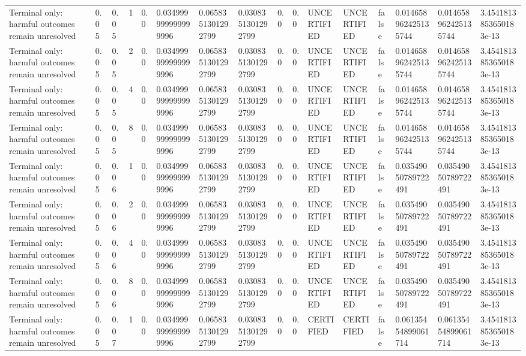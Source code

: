 \begin{tabular}{llllllllllllllll}
Terminal only: harmful outcomes remain unresolved & 0.05 & 0.05 & 1 & 0.0 & 0.034999999999999996 & 0.0658351301292799 & 0.0308351301292799 & 0.0 & 0.0 & UNCERTIFIED & UNCERTIFIED & false & 0.014658962425135744 & 0.014658962425135744 & 3.4541813853650183e-13 \\
Terminal only: harmful outcomes remain unresolved & 0.05 & 0.05 & 2 & 0.0 & 0.034999999999999996 & 0.0658351301292799 & 0.0308351301292799 & 0.0 & 0.0 & UNCERTIFIED & UNCERTIFIED & false & 0.014658962425135744 & 0.014658962425135744 & 3.4541813853650183e-13 \\
Terminal only: harmful outcomes remain unresolved & 0.05 & 0.05 & 4 & 0.0 & 0.034999999999999996 & 0.0658351301292799 & 0.0308351301292799 & 0.0 & 0.0 & UNCERTIFIED & UNCERTIFIED & false & 0.014658962425135744 & 0.014658962425135744 & 3.4541813853650183e-13 \\
Terminal only: harmful outcomes remain unresolved & 0.05 & 0.05 & 8 & 0.0 & 0.034999999999999996 & 0.0658351301292799 & 0.0308351301292799 & 0.0 & 0.0 & UNCERTIFIED & UNCERTIFIED & false & 0.014658962425135744 & 0.014658962425135744 & 3.4541813853650183e-13 \\
Terminal only: harmful outcomes remain unresolved & 0.05 & 0.06 & 1 & 0.0 & 0.034999999999999996 & 0.0658351301292799 & 0.0308351301292799 & 0.0 & 0.0 & UNCERTIFIED & UNCERTIFIED & false & 0.03549050789722491 & 0.03549050789722491 & 3.4541813853650183e-13 \\
Terminal only: harmful outcomes remain unresolved & 0.05 & 0.06 & 2 & 0.0 & 0.034999999999999996 & 0.0658351301292799 & 0.0308351301292799 & 0.0 & 0.0 & UNCERTIFIED & UNCERTIFIED & false & 0.03549050789722491 & 0.03549050789722491 & 3.4541813853650183e-13 \\
Terminal only: harmful outcomes remain unresolved & 0.05 & 0.06 & 4 & 0.0 & 0.034999999999999996 & 0.0658351301292799 & 0.0308351301292799 & 0.0 & 0.0 & UNCERTIFIED & UNCERTIFIED & false & 0.03549050789722491 & 0.03549050789722491 & 3.4541813853650183e-13 \\
Terminal only: harmful outcomes remain unresolved & 0.05 & 0.06 & 8 & 0.0 & 0.034999999999999996 & 0.0658351301292799 & 0.0308351301292799 & 0.0 & 0.0 & UNCERTIFIED & UNCERTIFIED & false & 0.03549050789722491 & 0.03549050789722491 & 3.4541813853650183e-13 \\
Terminal only: harmful outcomes remain unresolved & 0.05 & 0.07 & 1 & 0.0 & 0.034999999999999996 & 0.0658351301292799 & 0.0308351301292799 & 0.0 & 0.0 & CERTIFIED & CERTIFIED & false & 0.06135454899061714 & 0.06135454899061714 & 3.4541813853650183e-13 \\

\end{tabular}
